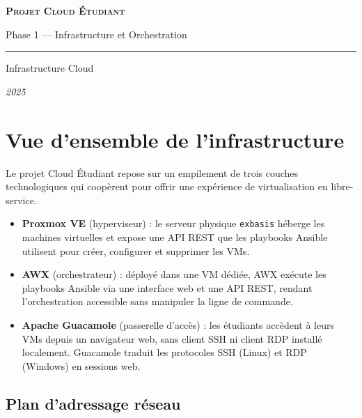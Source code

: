 \documentclass[a4paper]{article}
\newcommand{\cmd}[1]{\texttt{#1}}
\begin{document}

\begin{titlepage}
  \centering
  \vspace*{4cm}
  {\Large\bfseries\scshape Projet Cloud Étudiant\par}
  \vspace{0.5em}
  {\large Phase 1 --- Infrastructure et Orchestration\par}
  \vspace{3cm}
  \hrule
  \vspace{1cm}
  {\normalsize Infrastructure Cloud\par}
  \vspace{0.5em}
  {\small\itshape 2025\par}
  \vfill
\end{titlepage}

\tableofcontents
\newpage


\section{Vue d'ensemble de l'infrastructure}

Le projet Cloud Étudiant repose sur un empilement de trois couches technologiques qui coopèrent pour offrir une expérience de virtualisation en libre-service.

\begin{itemize}
  \item \textbf{Proxmox VE} (hyperviseur) : le serveur physique \cmd{exbasis} héberge les machines virtuelles et expose une API REST que les playbooks Ansible utilisent pour créer, configurer et supprimer les VMs.
  \item \textbf{AWX} (orchestrateur) : déployé dans une VM dédiée, AWX exécute les playbooks Ansible via une interface web et une API REST, rendant l'orchestration accessible sans manipuler la ligne de commande.
  \item \textbf{Apache Guacamole} (passerelle d'accès) : les étudiants accèdent à leurs VMs depuis un navigateur web, sans client SSH ni client RDP installé localement. Guacamole traduit les protocoles SSH (Linux) et RDP (Windows) en sessions web.
\end{itemize}

\subsection{Plan d'adressage réseau}
\end{document}

